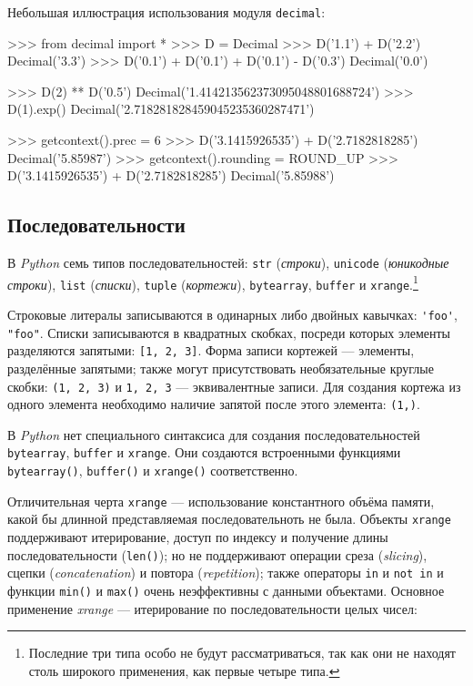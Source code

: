 Небольшая иллюстрация использования модуля \lstinline{decimal}:

\begin{pylst}{}{}
>>> from decimal import *
>>> D = Decimal
>>> D('1.1') + D('2.2')
Decimal('3.3')
>>> D('0.1') + D('0.1') + D('0.1') - D('0.3')
Decimal('0.0')

>>> D(2) ** D('0.5')
Decimal('1.414213562373095048801688724')
>>> D(1).exp()
Decimal('2.718281828459045235360287471')

>>> getcontext().prec = 6
>>> D('3.1415926535') + D('2.7182818285')
Decimal('5.85987')
>>> getcontext().rounding = ROUND_UP
>>> D('3.1415926535') + D('2.7182818285')
Decimal('5.85988')
\end{pylst}

\subsection{Последовательности}
В \emph{Python} семь типов последовательностей: \lstinline{str} (\emph{строки}), \lstinline{unicode} (\emph{юникодные строки}), \lstinline{list} (\emph{списки}), \lstinline{tuple} (\emph{кортежи}), \lstinline{bytearray}, \lstinline{buffer} и \lstinline{xrange}.\footnote{Последние три типа особо не будут рассматриваться, так как они не находят столь широкого применения, как первые четыре типа.}

Строковые литералы записываются в одинарных либо двойных кавычках: \lstinline{'foo'}, \lstinline{"foo"}. Списки записываются в квадратных скобках, посреди которых элементы разделяются запятыми: \lstinline{[1, 2, 3]}. Форма записи кортежей — элементы, разделённые запятыми; также могут присутствовать необязательные круглые скобки: \lstinline{(1, 2, 3)} и \lstinline{1, 2, 3} — эквивалентные записи. Для создания кортежа из одного элемента необходимо наличие запятой после этого элемента: \lstinline{(1,)}.

В \emph{Python} нет специального синтаксиса для создания последовательностей \lstinline{bytearray}, \lstinline{buffer} и \lstinline{xrange}. Они создаются встроенными функциями \lstinline{bytearray()}, \lstinline{buffer()} и \lstinline{xrange()} соответственно.

Отличительная черта \lstinline{xrange} — использование константного объёма памяти, какой бы длинной представляемая последовательноть не была. Объекты \lstinline{xrange} поддерживают итерирование, доступ по индексу и получение длины последовательности (\lstinline{len()}); но не поддерживают операции среза (\emph{slicing}), сцепки (\emph{concatenation}) и повтора (\emph{repetition}); также операторы \lstinline{in} и \lstinline{not in} и функции \lstinline{min()} и \lstinline{max()} очень неэффективны с данными объектами. Основное применение \emph{xrange} — итерирование по последовательности целых чисел:

